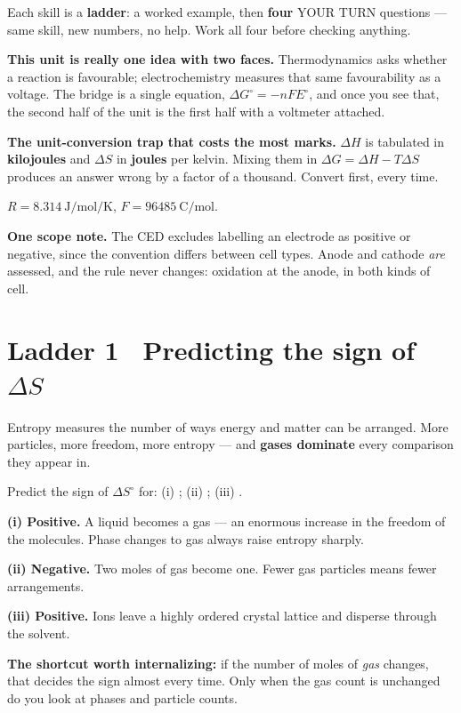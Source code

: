 \documentclass{apchem-worksheet}
\begin{document}
\apctitleblock

\begin{apcnote}
Each skill is a \textbf{ladder}: a worked example, then \textbf{four}
YOUR TURN questions --- same skill, new numbers, no help. Work all four
before checking anything.

\textbf{This unit is really one idea with two faces.} Thermodynamics asks
whether a reaction is favourable; electrochemistry measures that same
favourability as a voltage. The bridge is a single equation,
$\Delta G^\circ = -nFE^\circ$, and once you see that, the second half of
the unit is the first half with a voltmeter attached.

\textbf{The unit-conversion trap that costs the most marks.} $\Delta H$ is
tabulated in \textbf{kilojoules} and $\Delta S$ in \textbf{joules} per
kelvin. Mixing them in $\Delta G = \Delta H - T\Delta S$ produces an
answer wrong by a factor of a thousand. Convert first, every time.

$R = \SI{8.314}{\joule\per\mole\per\kelvin}$,
$F = \SI{96485}{\coulomb\per\mole}$.

\textbf{One scope note.} The CED excludes labelling an electrode as
positive or negative, since the convention differs between cell types.
Anode and cathode \emph{are} assessed, and the rule never changes:
oxidation at the anode, in both kinds of cell.
\end{apcnote}

\section*{\sffamily Ladder 1 \textbullet\ Predicting the sign of $\Delta S$}

Entropy measures the number of ways energy and matter can be arranged.
More particles, more freedom, more entropy --- and \textbf{gases dominate}
every comparison they appear in.

\begin{workedexample}
Predict the sign of $\Delta S^\circ$ for:
(i) ;
(ii) ;
(iii) .

\textbf{(i) Positive.} A liquid becomes a gas --- an enormous increase in
the freedom of the molecules. Phase changes to gas always raise entropy
sharply.

\textbf{(ii) Negative.} Two moles of gas become one. Fewer gas particles
means fewer arrangements.

\textbf{(iii) Positive.} Ions leave a highly ordered crystal lattice and
disperse through the solvent.

\textbf{The shortcut worth internalizing:} if the number of moles of
\emph{gas} changes, that decides the sign almost every time. Only when the
gas count is unchanged do you look at phases and particle counts.
\end{workedexample}
\end{document}
